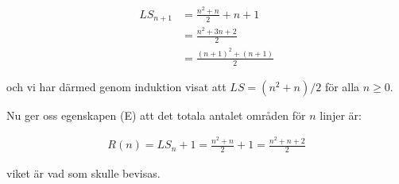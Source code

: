 \documentclass{article}
\begin{document}
\begin{align*}
  LS_{n + 1} &= \frac{n^{2} + n}{2} + n + 1 \\
             &= \frac{n^{2} + 3n + 2}{2} \\
  &= \frac{(n + 1)^{2} + (n + 1)}{2}
\end{align*}

och vi har därmed genom induktion visat att $LS = (n^{2} + n) / 2$ för alla $n \geq 0$.

Nu ger oss egenskapen (E) att det totala antalet områden för $n$ linjer är:

\begin{gather*}
  R(n) = LS_{n} + 1 = \frac{n^{2} + n}{2} + 1 = \frac{n^{2} + n + 2}{2}
\end{gather*}

viket är vad som skulle bevisas.

\centering{$\qed$}
\end{document}
